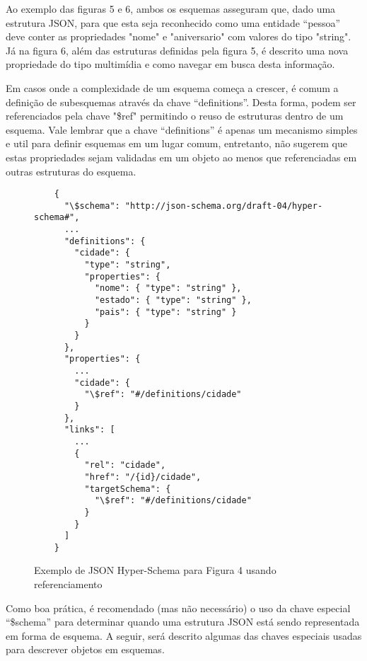 Ao exemplo das figuras 5 e 6, ambos os esquemas asseguram que, dado uma estrutura JSON, para que esta seja reconhecido como uma entidade “pessoa” deve conter as propriedades "nome" e "aniversario" com valores do tipo "string". Já na figura 6, além das estruturas definidas pela figura 5, é descrito uma nova propriedade do tipo multimídia e como navegar em busca desta informação.

Em casos onde a complexidade de um esquema começa a crescer, é comum a definição de subesquemas através da chave “definitions”. Desta forma, podem ser referenciados pela chave "\$ref" permitindo o reuso de estruturas dentro de um esquema. Vale lembrar que a chave “definitions” é apenas um mecanismo simples e util para definir esquemas em um lugar comum, entretanto, não sugerem que estas propriedades sejam validadas em um objeto ao menos que referenciadas em outras estruturas do esquema. \cite{Leach2014}

\begin{figure}[H]
  \centering
  \begin{verbatim}
    {
      "\$schema": "http://json-schema.org/draft-04/hyper-schema#",
      ...
      "definitions": {
        "cidade": {
          "type": "string",
          "properties": {
            "nome": { "type": "string" },
            "estado": { "type": "string" },
            "pais": { "type": "string" }
          }
        }
      },
      "properties": {
        ...
        "cidade": {
          "\$ref": "#/definitions/cidade"
        }
      },
      "links": [
        ...
        {
          "rel": "cidade",
          "href": "/{id}/cidade",
          "targetSchema": {
            "\$ref": "#/definitions/cidade"
          }
        }
      ]
    }
  \end{verbatim}
  \caption{Exemplo de JSON Hyper-Schema para Figura 4 usando referenciamento}
\end{figure}

Como boa prática, é recomendado (mas não necessário) o uso da chave especial “\$schema” para determinar quando uma estrutura JSON está sendo representada em forma de esquema. A seguir, será descrito algumas das chaves especiais usadas para descrever objetos em esquemas. \cite{Droettboom2015}

